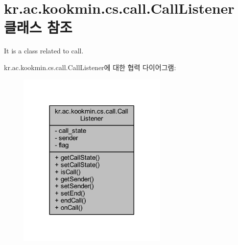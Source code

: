 \hypertarget{classkr_1_1ac_1_1kookmin_1_1cs_1_1call_1_1_call_listener}{}\section{kr.\+ac.\+kookmin.\+cs.\+call.\+Call\+Listener 클래스 참조}
\label{classkr_1_1ac_1_1kookmin_1_1cs_1_1call_1_1_call_listener}


It is a class related to call.  




kr.\+ac.\+kookmin.\+cs.\+call.\+Call\+Listener에 대한 협력 다이어그램\+:\nopagebreak
\begin{figure}[H]
\begin{center}
\leavevmode
\includegraphics[width=209pt]{classkr_1_1ac_1_1kookmin_1_1cs_1_1call_1_1_call_listener__coll__graph}
\end{center}
\end{figure}
